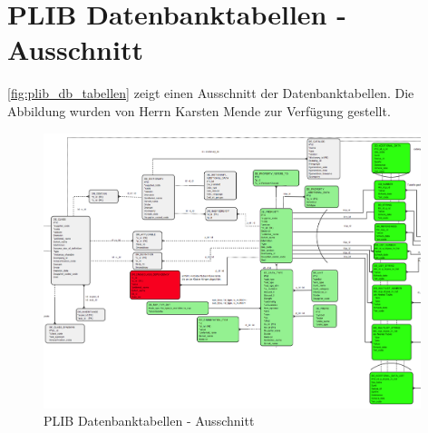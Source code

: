 \chapter{PLIB Datenbanktabellen - Ausschnitt}\label{kap:anh_plib_db}

\autoref{fig:plib_db_tabellen} zeigt einen Ausschnitt der Datenbanktabellen. Die Abbildung wurden von Herrn Karsten Mende zur Verfügung gestellt. 

\begin{figure}[htbp]
	\centering
		\includegraphics[width=0.98\textwidth]{images/plib_datenbankausschnitt.png}
	\caption{PLIB Datenbanktabellen - Ausschnitt}
	\label{fig:plib_db_tabellen}
\end{figure}